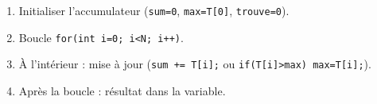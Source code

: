 \documentclass[11pt]{article}
\begin{document}
\begin{bilan}
\begin{methode}
\begin{enumerate}
    \item Initialiser l'accumulateur (\texttt{sum=0}, \texttt{max=T[0]}, \texttt{trouve=0}).
    \item Boucle \texttt{for(int i=0; i<N; i++)}.
    \item À l'intérieur : mise à jour (\texttt{sum += T[i];} ou \texttt{if(T[i]>max) max=T[i];}).
    \item Après la boucle : résultat dans la variable.
\end{enumerate}
\end{methode}

\end{bilan}
\end{document}
